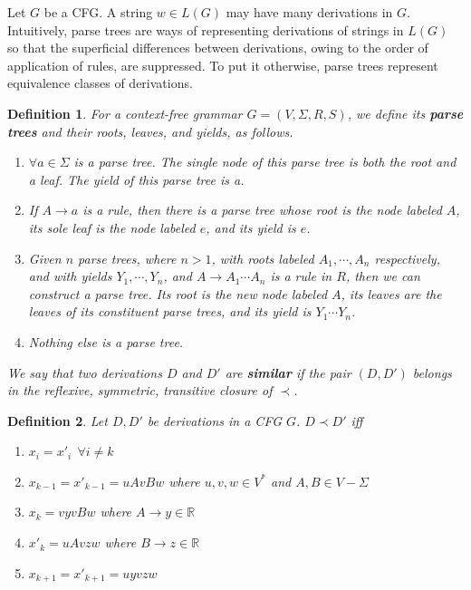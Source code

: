 \documentclass[aps,pra,onecolumn,notitlepage,superscriptaddress]{revtex4-1}
\newcommand{\R}{\mathbb{R}}
\newtheorem{defi}{Definition}
\begin{document}
    Let $G$ be a CFG. A string $w \in L(G)$ may have many derivations in $G$. Intuitively, parse trees are ways of representing derivations of strings in $L(G)$ so that the superficial differences between derivations, owing to the order of application of rules, are suppressed. To put it otherwise, parse trees represent equivalence classes of derivations. 
    \begin{defi}
        For a context-free grammar $G = (V, \Sigma, R, S)$, we define its \textbf{parse trees} and their roots, leaves, and yields, as follows.
        \begin{enumerate}
            \item $\forall a \in \Sigma$ is a parse tree. The single node of this parse tree is both the root and a leaf. The yield of this parse tree is a.
            \item If $A \to a$ is a rule, then there is a parse tree whose root is the node labeled $A$, its sole leaf is the node labeled $e$, and its yield is $e$.
            \item Given $n$ parse trees, where $n > 1$, with roots labeled $A_1, \cdots, A_n$ respectively, and with yields $Y_1, \cdots , Y_n$, and $A \to A_1 \cdots A_n$ is a rule in $R$, then we can construct a parse tree. Its root is the new node labeled $A$, its leaves are the leaves of its
            constituent parse trees, and its yield is $Y_1 \cdots Y_n$.
            \item Nothing else is a parse tree.
        \end{enumerate}

        We say that two derivations $D$ and $D'$ are \textbf{similar} if the pair $(D, D')$ belongs in the reflexive, symmetric, transitive closure of $\prec$. 
    \end{defi}

    \begin{defi}
        Let $D,D'$ be derivations in a CFG $G$. $D \prec D'$ iff
        \begin{enumerate}
            \item $x_i = x'_i \ \ \forall i \neq k$
            \item $x_{k-1} = x'_{k-1} = uAvBw$ where $u,v,w \in V^*$ and $A,B \in V-\Sigma$
            \item $x_k = vyvBw$ where $A \to y \in \R$
            \item $x'_k = uAvzw$ where $B \to z \in \R$
            \item $x_{k+1} = x'_{k+1} = uyvzw$
        \end{enumerate}
    \end{defi}
\end{document}
